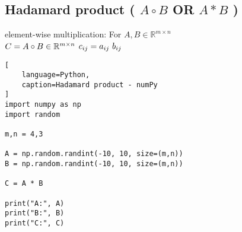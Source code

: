 \subsection{Hadamard product ( $A \circ B$ OR $A \ast B$ ) \cite{mfml/book/mml/Deisenroth-Faisal-Ong}}

element-wise multiplication: For $A,B \in \mathbb{R}^{m\times n}$
\\
$
\hfill
    C = A \circ B \in \mathbb{R}^{m\times n}
$
\hfill
$
    c_{ij} = a_{ij}\ b_{ij}
\hfill
$

\begin{lstlisting}[
    language=Python,
    caption=Hadamard product - numPy
]
import numpy as np
import random

m,n = 4,3

A = np.random.randint(-10, 10, size=(m,n))
B = np.random.randint(-10, 10, size=(m,n))

C = A * B

print("A:", A)
print("B:", B)
print("C:", C)
\end{lstlisting}
